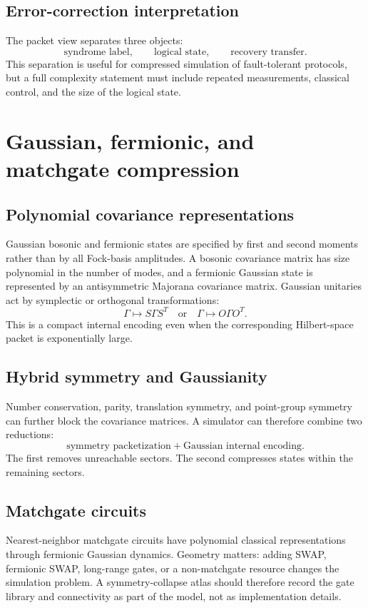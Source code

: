 \subsection{Error-correction interpretation}
The packet view separates three objects:
\[
\text{syndrome label},
\qquad
\text{logical state},
\qquad
\text{recovery transfer}.
\]
This separation is useful for compressed simulation of fault-tolerant protocols, but a full complexity statement must include repeated measurements, classical control, and the size of the logical state.

\section{Gaussian, fermionic, and matchgate compression}
\label{s:ch:gaussian}

\subsection{Polynomial covariance representations}
Gaussian bosonic and fermionic states are specified by first and second moments rather than by all Fock-basis amplitudes. A bosonic covariance matrix has size polynomial in the number of modes, and a fermionic Gaussian state is represented by an antisymmetric Majorana covariance matrix. Gaussian unitaries act by symplectic or orthogonal transformations:
\[
\Gamma\longmapsto S\Gamma S^T
\quad\text{or}\quad
\Gamma\longmapsto O\Gamma O^T.
\]
This is a compact internal encoding even when the corresponding Hilbert-space packet is exponentially large.

\subsection{Hybrid symmetry and Gaussianity}
Number conservation, parity, translation symmetry, and point-group symmetry can further block the covariance matrices. A simulator can therefore combine two reductions:
\[
\text{symmetry packetization}
+
\text{Gaussian internal encoding}.
\]
The first removes unreachable sectors. The second compresses states within the remaining sectors.

\subsection{Matchgate circuits}
Nearest-neighbor matchgate circuits have polynomial classical representations through fermionic Gaussian dynamics. Geometry matters: adding SWAP, fermionic SWAP, long-range gates, or a non-matchgate resource changes the simulation problem. A symmetry-collapse atlas should therefore record the gate library and connectivity as part of the model, not as implementation details.

